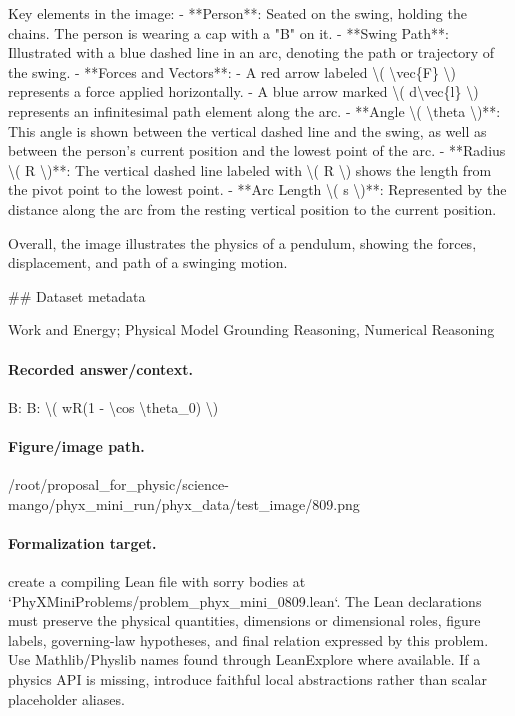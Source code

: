 Key elements in the image:
- **Person**: Seated on the swing, holding the chains. The person is wearing a cap with a "B" on it.
- **Swing Path**: Illustrated with a blue dashed line in an arc, denoting the path or trajectory of the swing.
- **Forces and Vectors**:
  - A red arrow labeled \textbackslash{}( \textbackslash{}vec\{F\} \textbackslash{}) represents a force applied horizontally.
  - A blue arrow marked \textbackslash{}( d\textbackslash{}vec\{l\} \textbackslash{}) represents an infinitesimal path element along the arc.
- **Angle \textbackslash{}( \textbackslash{}theta \textbackslash{})**: This angle is shown between the vertical dashed line and the swing, as well as between the person's current position and the lowest point of the arc.
- **Radius \textbackslash{}( R \textbackslash{})**: The vertical dashed line labeled with \textbackslash{}( R \textbackslash{}) shows the length from the pivot point to the lowest point.
- **Arc Length \textbackslash{}( s \textbackslash{})**: Represented by the distance along the arc from the resting vertical position to the current position.

Overall, the image illustrates the physics of a pendulum, showing the forces, displacement, and path of a swinging motion.

\#\# Dataset metadata

Work and Energy; Physical Model Grounding Reasoning, Numerical Reasoning

\paragraph{Recorded answer/context.}
B: B: \textbackslash{}( wR(1 - \textbackslash{}cos \textbackslash{}theta\_0) \textbackslash{})

\paragraph{Figure/image path.}
/root/proposal\_for\_physic/science-mango/phyx\_mini\_run/phyx\_data/test\_image/809.png

\paragraph{Formalization target.}
create a compiling Lean file with sorry bodies at `PhyXMiniProblems/problem\_phyx\_mini\_0809.lean`. The Lean declarations must preserve the physical quantities, dimensions or dimensional roles, figure labels, governing-law hypotheses, and final relation expressed by this problem.
Use Mathlib/Physlib names found through LeanExplore where available. If a physics API is missing, introduce faithful local abstractions rather than scalar placeholder aliases.

